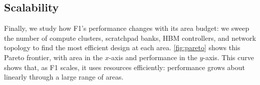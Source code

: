 \figConfigs

\subsection{Scalability}
\label{sec:scalability}

Finally, we study how F1's performance changes with its area budget: 
we sweep the number of compute clusters, scratchpad banks, HBM controllers,
and network topology to find the most efficient design at each area.
\autoref{fig:pareto} shows this
Pareto frontier, with
area in the $x$-axis and performance in the $y$-axis.
This curve shows that, as F1 scales, it uses resources efficiently:
performance grows about linearly through a large range of areas.





